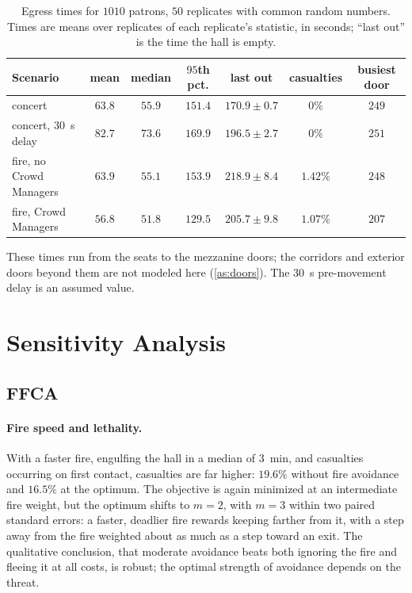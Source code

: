 \documentclass[14pt]{article}
\theoremstyle{definition}
\begin{document}
\begin{table}[H]
  \centering
  \caption{Egress times for $1010$ patrons, $50$ replicates with common random numbers.
  Times are means over replicates of each replicate's statistic, in seconds; ``last
  out'' is the time the hall is empty.}
  \label{tab:egress}
  \begin{tabular}{lcccccc}
    \toprule
    Scenario & mean & median & $95$th pct. & last out & casualties & busiest door \\
    \midrule
    concert & $63.8$ & $55.9$ & $151.4$ & $170.9 \pm 0.7$ & $0\%$ & $249$ \\
    concert, \SI{30}{s} delay & $82.7$ & $73.6$ & $169.9$ & $196.5 \pm 2.7$ & $0\%$ & $251$ \\
    fire, no Crowd Managers & $63.9$ & $55.1$ & $153.9$ & $218.9 \pm 8.4$ & $1.42\%$ & $248$ \\
    fire, Crowd Managers & $56.8$ & $51.8$ & $129.5$ & $205.7 \pm 9.8$ & $1.07\%$ & $207$ \\
    \bottomrule
  \end{tabular}
\end{table}

These times run from the seats to the mezzanine doors; the corridors and exterior doors
beyond them are not modeled here (\cref{as:doors}). The \SI{30}{s} pre-movement delay is
an assumed value.

\section{Sensitivity Analysis}
\subsection{FFCA}
\paragraph{Fire speed and lethality.} With a faster fire, engulfing the hall in a median
of \SI{3}{min}, and casualties occurring on first contact, casualties are far higher:
$19.6\%$ without fire avoidance and $16.5\%$ at the optimum. The objective is again
minimized at an intermediate fire weight, but the optimum shifts to $m = 2$, with
$m = 3$ within two paired standard errors: a faster, deadlier fire rewards keeping
farther from it, with a step away from the fire weighted about as much as a step toward
an exit. The qualitative conclusion, that moderate avoidance beats both ignoring the
fire and fleeing it at all costs, is robust; the optimal strength of avoidance depends
on the threat.
\end{document}
